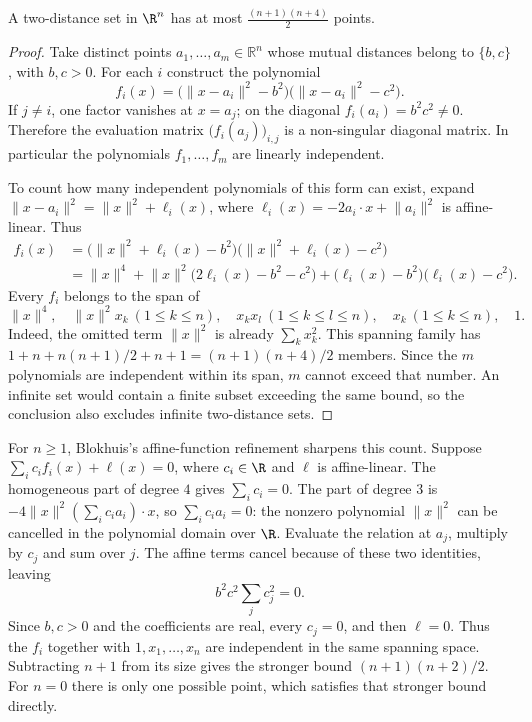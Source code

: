 \begin{theorem}\label{combinatorial:thm:twodist}
A two-distance set in $\R^n$ has at most $\frac{(n+1)(n+4)}2$ points.
\end{theorem}
\begin{proof}
Take distinct points $a_1,\ldots,a_m\in\mathbb R^n$ whose
mutual distances belong to $\{b,c\}$, with $b,c>0$.
For each $i$ construct the polynomial
\[
f_i(x)=\bigl(\lVert x-a_i\rVert^2-b^2\bigr)
       \bigl(\lVert x-a_i\rVert^2-c^2\bigr).
\]
If $j\ne i$, one factor vanishes at $x=a_j$;
on the diagonal $f_i(a_i)=b^2c^2\ne0$.
Therefore the evaluation matrix
$\bigl(f_i(a_j)\bigr)_{i,j}$ is a non-singular
diagonal matrix. In particular the polynomials
$f_1,\ldots,f_m$ are linearly independent.

To count how many independent polynomials of this form
can exist, expand
$\lVert x-a_i\rVert^2=\lVert x\rVert^2+\ell_i(x)$,
where $\ell_i(x)=-2a_i\cdot x+\lVert a_i\rVert^2$
is affine-linear. Thus
\[
\begin{aligned}
f_i(x)
&=\bigl(\lVert x\rVert^2+\ell_i(x)-b^2\bigr)
  \bigl(\lVert x\rVert^2+\ell_i(x)-c^2\bigr)\\
&=\lVert x\rVert^4
 +\lVert x\rVert^2\bigl(2\ell_i(x)-b^2-c^2\bigr)
 +\bigl(\ell_i(x)-b^2\bigr)\bigl(\ell_i(x)-c^2\bigr).
\end{aligned}
\]
Every $f_i$ belongs to the span of
\[
\lVert x\rVert^4,\quad
\lVert x\rVert^2x_k\ (1\le k\le n),\quad
x_kx_l\ (1\le k\le l\le n),\quad
x_k\ (1\le k\le n),\quad 1.
\]
Indeed, the omitted term $\lVert x\rVert^2$ is already
$\sum_kx_k^2$. This spanning family has
$1+n+n(n+1)/2+n+1=(n+1)(n+4)/2$ members.
Since the $m$ polynomials are independent within its span,
$m$ cannot exceed that number.
An infinite set would contain a finite subset exceeding the same bound,
so the conclusion also excludes infinite two-distance sets.
\end{proof}

For $n\ge1$, Blokhuis's affine-function refinement sharpens this count.
Suppose $\sum_i c_i f_i(x)+\ell(x)=0$, where $c_i\in\R$ and $\ell$ is
affine-linear. The homogeneous part of degree $4$ gives $\sum_i c_i=0$.
The part of degree $3$ is $-4\|x\|^2(\sum_i c_i a_i)\cdot x$, so
$\sum_i c_i a_i=0$: the nonzero polynomial $\|x\|^2$ can be cancelled
in the polynomial domain over $\R$. Evaluate the relation at $a_j$,
multiply by $c_j$ and sum over $j$. The affine terms cancel because of
these two identities, leaving
\[
b^2c^2\sum_j c_j^2=0.
\]
Since $b,c>0$ and the coefficients are real, every $c_j=0$, and then
$\ell=0$. Thus the $f_i$ together with $1,x_1,\dots,x_n$ are independent
in the same spanning space. Subtracting $n+1$ from its size gives the
stronger bound $(n+1)(n+2)/2$. For $n=0$ there is only one possible point,
which satisfies that stronger bound directly.

